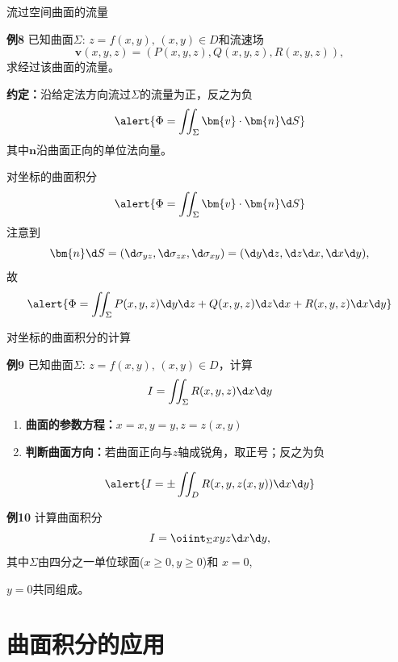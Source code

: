 \begin{frame}{流过空间曲面的流量}
	\linespread{1.2}
	\begin{exampleblock}{{\bf 例8}\hfill}
		已知曲面$\Sigma:\,z=f(x,y),\,(x,y)\in D$和流速场
		$$\bm{v}(x,y,z)=(P(x,y,z),Q(x,y,z),R(x,y,z)),$$
		求经过该曲面的流量。
	\end{exampleblock}
	\alert{{\bf 约定：}沿给定法方向流过$\Sigma$的流量为正，反之为负}\pause
	$$\alert{\Phi=\iint_{\Sigma}\bm{v}\cdot\bm{n}\d S}$$
	\pause 其中$\bm{n}$沿曲面正向的单位法向量。
\end{frame}

\begin{frame}{对坐标的曲面积分}
	\linespread{1.2}
	$$\alert{\Phi=\iint_{\Sigma}\bm{v}\cdot\bm{n}\d S}$$
	\pause 注意到
	$$\bm{n}\d S=(\d\sigma_{yz},\d\sigma_{zx},\d\sigma_{xy})
	=(\d y\d z,\d z\d x,\d x\d y),$$
	\pause 故
	$$\alert{\Phi=\iint_{\Sigma}P(x,y,z)\d y\d z
	+Q(x,y,z)\d z\d x+R(x,y,z)\d x\d y}$$
\end{frame}

\begin{frame}{对坐标的曲面积分的计算}
	\linespread{1.2}
	\begin{exampleblock}{{\bf 例9}\hfill}
		已知曲面$\Sigma:\,z=f(x,y),\,(x,y)\in D$，计算
		$$I=\iint_{\Sigma}R(x,y,z)\d x\d y$$
	\end{exampleblock}\pause 
	\begin{enumerate}
	  \item {\bf 曲面的参数方程：}\pause $x=x,y=y,z=z(x,y)$\pause 
	  \item {\bf 判断曲面方向：}若曲面正向与$z$轴成锐角，取正号；反之为负\pause 
	\end{enumerate}
	$$\alert{I=\pm\iint_DR(x,y,z(x,y))\d x\d y}$$
\end{frame}

\begin{frame}
	\linespread{1.2}
	\begin{exampleblock}{{\bf 例10}\hfill}
		计算曲面积分
		$$I=\oiint_{\Sigma}xyz\d x\d y,$$
		其中$\Sigma$由四分之一单位球面($x\geq 0,y\geq 0$)和
		$x=0$,
		
		$y=0$共同组成。
	\end{exampleblock}
\end{frame}

\section{曲面积分的应用}

